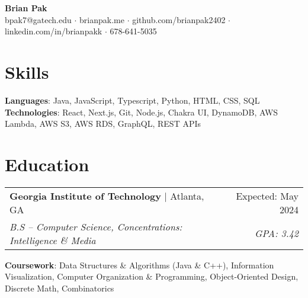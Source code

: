 \documentclass[letterpaper,11pt]{article}
\makeatletter
\newcommand{\resumeEducationHeading}[5]{
    \begin{tabular*}{0.99\textwidth}[t]{l@{\extracolsep{\fill}}r}
      \textbf{#1} $\vert$ #2 & #3 \\
      \textit{\small#4} & \textit{\small #5} \\
    \end{tabular*}\vspace{5pt}
}
\makeatother
\begin{document}
\begin{center}
  \textbf{\huge Brian Pak} \\
  \vspace*{0.1cm}
  {bpak7@gatech.edu} $\cdot$ {brianpak.me} $\cdot$ {github.com/brianpak2402} $\cdot$ {linkedin.com/in/brianpakk}  $\cdot$ 678-641-5035 
\end{center}

\section{Skills}
    \textbf{Languages}{: Java, JavaScript, Typescript, Python, HTML, CSS, SQL } \\
    \textbf{Technologies}{: React, Next.js, Git, Node.js, Chakra UI, DynamoDB, AWS Lambda, AWS S3, AWS RDS, GraphQL, REST APIs}


\section{Education}
    \resumeEducationHeading
      {Georgia Institute of Technology}{Atlanta, GA}{Expected: May 2024}
      {B.S -- Computer Science, Concentrations: Intelligence \& Media}{GPA: 3.42}
    \textbf{Coursework}{: Data Structures \& Algorithms (Java \& C++), Information Visualization, Computer Organization \& Programming, Object-Oriented Design, Discrete Math, Combinatorics} \\


\end{document}
